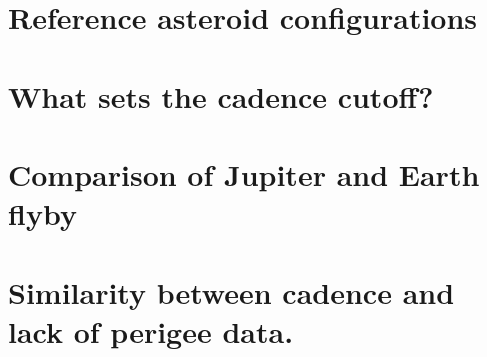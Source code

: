 \documentclass[fleqn,usenatbib]{mnras}
\begin{document}






\appendix

\section{Reference asteroid configurations}
\label{app:reference-configs}




\section{What sets the cadence cutoff?}
\label{app:cadence-tests}




\section{Comparison of Jupiter and Earth flyby}
\label{app:jupiter-earth}




\section{Similarity between cadence and lack of perigee data.}
\label{app:cadence-perigee-test}


\bsp	%
\label{lastpage}
\end{document}
